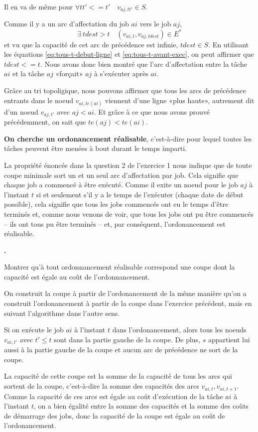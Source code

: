 \documentclass{article}
\newcounter{enoncecount}
\newenvironment{enonce}
{
\stepcounter{enoncecount}
\bf\small \arabic{enoncecount}.
\begin{bf}
}
{
\end{bf}
}
\begin{document}
Il en va de même pour $\forall tt' <= t' \quad v_{aj,tt'} \in S$.

Comme il y a un arc d'affectation du job $ai$ vers le job $aj$,
$$\exists\ {} tdest > t \quad (v_{ai,t},v_{aj,tdest}) \in E^*$$
et vu que la capacité de cet arc de précédence est infinie, $tdest \in S$. En utilisant les équations \ref{eq:tous-t-debut-ligne} et
\ref{eq:tous-t-avant-exec}, on peut affirmer que $tdest <= t$. Nous avons donc bien montré que l'arc d'affectation entre la tâche $ai$ et la
tâche $aj$ «forçait» $aj$ à s'exécuter après $ai$.

Grâce au tri topoligique, nous pouvons affirmer que tous les arcs de précédence entrants dans le noeud $v_{ai,te(ai)}$ viennent d'une ligne
«plus haute», autrement dit d'un noeud $v_{aj,t'}$ avec $aj < ai$. Et grâce à ce que nous avons prouvé précédemment,
on sait que $te(aj) < te(ai)$.

\textbf{On cherche un ordonancement réalisable}, c'est-à-dire pour lequel
toutes les tâches peuvent être menées à bout durant le temps
imparti.


La propriété énoncée dans la question 2 de l'exercice 1 nous indique que de toute coupe minimale sort un et un seul arc d'affectation par
job. Cela signifie que chaque job a commencé à être exécuté. Comme il exite un noeud pour le job $aj$ à l'instant $t$ si et seulement s'il y
a le temps de l'exécuter ( chaque date de début possible\fg), cela signifie que tous les jobs commencés ont eu le temps d'être terminés
et, comme nous venons de voir, que tous les jobs ont pu être commencés -- ils ont tous pu être terminés -- et, par conséquent,
l'ordonancement est réalisable.

\begin{enonce}
Montrer qu'à tout ordonnancement réalisable correspond une coupe dont la capacité est égale au coût de l'ordonnancement.
\end{enonce}

On construit la coupe à partir de l'ordonancement de la même manière
qu'on a construit l'ordonancement à partir de la coupe dans l'exercice
précédent, mais en suivant l'algorithme dans l'autre sens.

Si on exécute le job $ai$ à l'instant $t$ dans l'ordonancement, alors
tous les noeuds $v_{ai,t'}$ avec $t' \leq t$ sont dans la partie \og
gauche\fg{} de la coupe. De plus, $s$ appartient lui aussi à la partie
gauche de la coupe et aucun arc de précédence ne sort de la coupe.

La capacité de cette coupe est la somme de la capacité de tous les
arcs qui sortent de la coupe, c'est-à-dire la somme des capacités des
arcs $v_{ai,t}, v_{ai,t+1}$. Comme la capacité de ces arcs est égale au
coût d'exécution de la tâche $ai$ à l'instant $t$, on a bien égalité entre
la somme des capacités et la somme des coûts de démarrage des jobs,
donc la capacité de la coupe est égale au coût de l'ordonancement.
\end{document}
